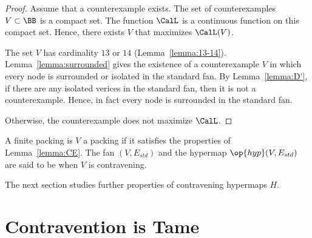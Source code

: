 \begin{proof} Assume that a counterexample exists.  The set of
  counterexamples $V\subset\BB$ is a compact set.  The function
  $\CalL$ is a continuous function on this compact set.  Hence, there
  exists $V$ that maximizes $\CalL(V)$.

  The set $V$ has cardinality $13$ or $14$
  (Lemma~\ref{lemma:13-14}). Lemma~\ref{lemma:surrounded} gives the
  existence of a counterexample $V$ in which every node is
  surrounded or isolated in the standard fan.  By
  Lemma~\ref{lemma:D'}, if there are any isolated verices in the
  standard fan, then it is not a counterexample.  Hence, in fact every
  node is surrounded in the standard fan.

    Otherwise, the counterexample does not
  maximize $\CalL$.  %
\end{proof}


\begin{definition}[contravening]
  A finite packing is $V$ a  packing if it
  satisfies the properties of Lemma~\ref{lemma:CE}.  The fan
  $(V,E_{std})$ and the hypermap $\op{hyp}(V,E_{std})$ are said to be
   when $V$ is contravening.
\end{definition}



The next section studies further properties of contravening hypermaps $H$.



\section{Contravention is Tame}
%
\label{sec:contraproof}

